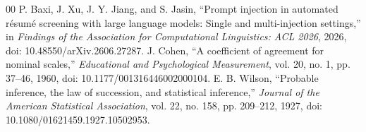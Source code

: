 \documentclass[conference]{IEEEtran}
\begin{document}
\begin{thebibliography}{00}
 P. Baxi, J. Xu, J. Y. Jiang, and S. Jasin, ``Prompt injection in automated r\'esum\'e screening with large language models: Single and multi-injection settings,'' in \textit{Findings of the Association for Computational Linguistics: ACL 2026}, 2026, doi: 10.48550/arXiv.2606.27287.
 J. Cohen, ``A coefficient of agreement for nominal scales,'' \textit{Educational and Psychological Measurement}, vol. 20, no. 1, pp. 37--46, 1960, doi: 10.1177/001316446002000104.
 E. B. Wilson, ``Probable inference, the law of succession, and statistical inference,'' \textit{Journal of the American Statistical Association}, vol. 22, no. 158, pp. 209--212, 1927, doi: 10.1080/01621459.1927.10502953.
\end{thebibliography}
\end{document}
